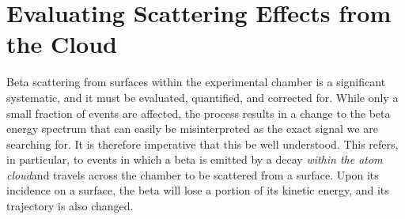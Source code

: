 


\FloatBarrier
\section{Evaluating Scattering Effects from the Cloud}
\label{sec:bs}
%
%
%
	Beta scattering from surfaces within the experimental chamber is a significant systematic, and it must be evaluated, quantified, and corrected for.  While only a small fraction of events are affected, the process results in a change to the beta energy spectrum that can easily be misinterpreted as the exact signal we are searching for.  It is therefore imperative that this be well understood. 
This refers, in particular, to events in which a beta is emitted by a decay \emph{within the atom cloud}and travels across the chamber to be scattered from a surface.  Upon its incidence on a surface, the beta will lose a portion of its kinetic energy, and its trajectory is also changed.  

